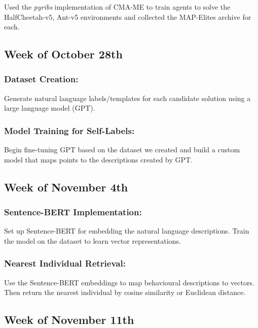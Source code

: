 \documentclass[11pt]{article}
\begin{document}
Used the \emph{pyribs} implementation of CMA-ME to train agents to solve the HalfCheetah-v5, Ant-v5 environments
and collected the MAP-Elites archive for each.

\subsection{Week of October 28th}
\label{sec:org06affc8}

\subsubsection{Dataset Creation:}
\label{sec:org87b8caa}

Generate natural language labels/templates for each candidate solution using a large language model (GPT).

\subsubsection{Model Training for Self-Labels:}
\label{sec:org66ede89}

Begin fine-tuning GPT based on the dataset we created and build a custom model that maps
points to the descriptions created by GPT.

\subsection{Week of November 4th}
\label{sec:orgb1842ca}

\subsubsection{Sentence-BERT Implementation:}
\label{sec:org2f8f4c5}

Set up Sentence-BERT for embedding the natural language descriptions.
Train the model on the dataset to learn vector representations.

\subsubsection{Nearest Individual Retrieval:}
\label{sec:org5567a91}

Use the Sentence-BERT embeddings to map behavioural descriptions to vectors.
Then return the nearest individual by cosine similarity or Euclidean distance.

\subsection{Week of November 11th}
\label{sec:org5b11a13}
\end{document}
